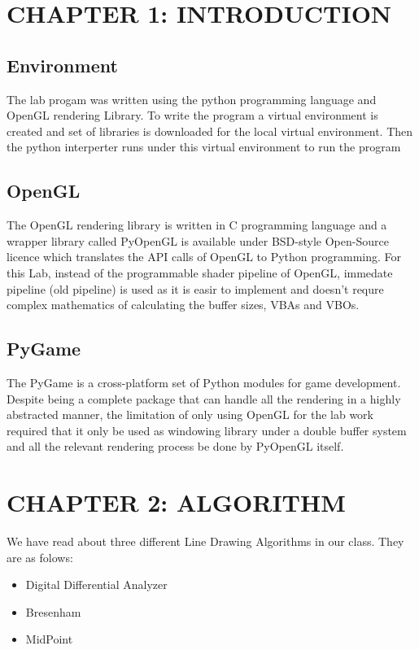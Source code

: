 \documentclass[12pt]{article}
\begin{document}
\clearpage
\thispagestyle{empty}
\tableofcontents

\clearpage
\thispagestyle{empty}
\listoffigures

\clearpage
{}
\section{CHAPTER 1: INTRODUCTION}

\subsection{Environment}
The lab progam was written using the python programming language and OpenGL rendering Library. To write the program a virtual environment is
created and set of libraries is downloaded for the local virtual environment. Then the python interperter runs under this virtual environment
to run the program

\subsection{OpenGL}
The OpenGL rendering library is written in C programming language and a wrapper library called PyOpenGL is available under BSD-style Open-Source licence which translates the
API calls of OpenGL to Python programming. For this Lab, instead of the programmable shader pipeline of OpenGL, immedate pipeline (old pipeline) is used as it is easir to implement and doesn't
requre complex mathematics of calculating the buffer sizes, VBAs and VBOs.

\subsection{PyGame}
The PyGame is a cross-platform set of Python modules for game development. Despite being a complete package that can handle all the rendering in a highly abstracted manner, the
limitation of only using OpenGL for the lab work required that it only be used as windowing library under a double buffer system and all the relevant rendering process be done by PyOpenGL itself.

\section{CHAPTER 2: ALGORITHM}
We have read about three different Line Drawing Algorithms in our class. They are as folows:
\begin{itemize}
    \item Digital Differential Analyzer
    \item Bresenham
    \item MidPoint
\end{itemize}
\clearpage
\end{document}
